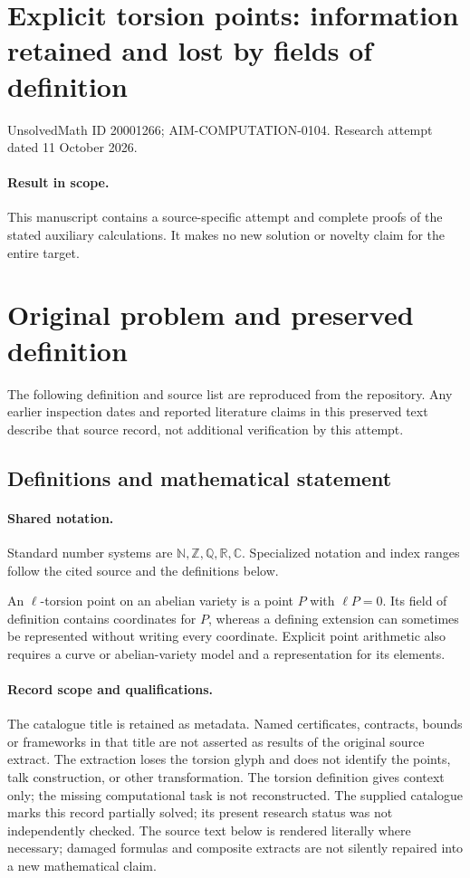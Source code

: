 \documentclass[11pt]{article}
\begin{document}
\section*{Explicit torsion points: information retained and lost by fields of definition}
\noindent UnsolvedMath ID 20001266; AIM-COMPUTATION-0104. Research attempt dated 11 October 2026.
\paragraph{Result in scope.}This manuscript contains a source-specific attempt and complete proofs of the stated auxiliary calculations. It makes no new solution or novelty claim for the entire target.
\section{Original problem and preserved definition}
The following definition and source list are reproduced from the repository. Any earlier inspection dates and reported literature claims in this preserved text describe that source record, not additional verification by this attempt.
\subsection{Definitions and mathematical statement}

\paragraph{Shared notation.}Standard number systems are $\mathbb N,\mathbb Z,\mathbb Q,\mathbb R,\mathbb C$. Specialized notation and index ranges follow the cited source and the definitions below.


An $\ell$-torsion point on an abelian variety is a point $P$ with $\ell P=0$. Its field of definition contains coordinates for $P$, whereas a defining extension can sometimes be represented without writing every coordinate. Explicit point arithmetic also requires a curve or abelian-variety model and a representation for its elements.
\paragraph{Record scope and qualifications.}
The catalogue title is retained as metadata. Named certificates, contracts, bounds or frameworks in that title are not asserted as results of the original source extract.
The extraction loses the torsion glyph and does not identify the points, talk construction, or other transformation. The torsion definition gives context only; the missing computational task is not reconstructed. The supplied catalogue marks this record partially solved; its present research status was not independently checked.
The source text below is rendered literally where necessary; damaged formulas and composite extracts are not silently repaired into a new mathematical claim.
\end{document}
